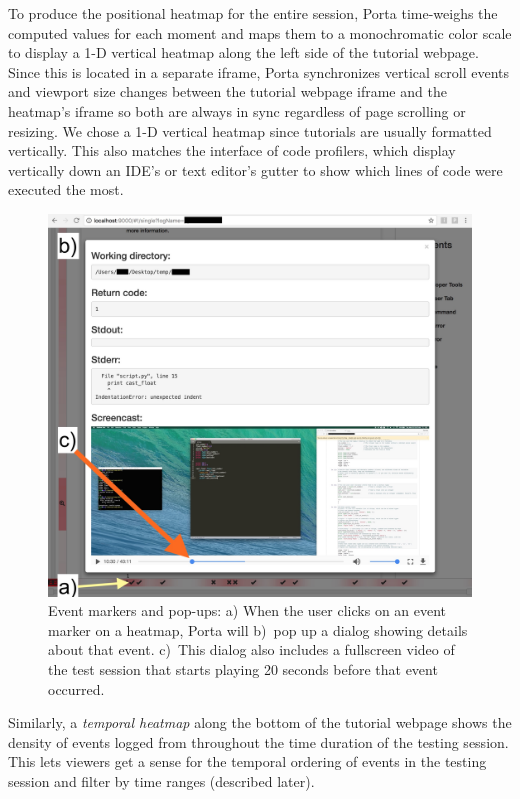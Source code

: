 To produce the positional heatmap for the entire session, Porta time-weighs the
computed values for each moment and maps them to a monochromatic
color scale to display a 1-D vertical heatmap along the
left side of the tutorial webpage. Since this is located in a separate
iframe, Porta synchronizes vertical scroll events and viewport size
changes between the tutorial webpage iframe and the heatmap's iframe so
both are always in sync regardless of page scrolling or resizing.
%
We chose a 1-D vertical heatmap since tutorials are usually formatted
vertically. This also matches the interface of code profilers, which
display vertically down an IDE's or text editor's gutter to show which
lines of code were executed the most.


\begin{figure}[h!]
  \includegraphics[width=0.95\columnwidth]{figures/porta/popup.jpg}

  \caption{Event markers and pop-ups: a) When the user clicks on an
  event marker on a heatmap, Porta will b)~pop up a dialog showing
  details about that event. c)~This dialog also includes a fullscreen video
  of the test session that starts playing 20 seconds before that event
  occurred.}

  \label{fig:popup}
  \vspace{-0.5em} %
\end{figure}


Similarly, a \emph{temporal heatmap} along the bottom of the
tutorial webpage shows the density of events
logged from  throughout the time duration of the
testing session. This lets viewers get a sense for the temporal ordering
of events in the testing session and filter by time ranges (described later).

